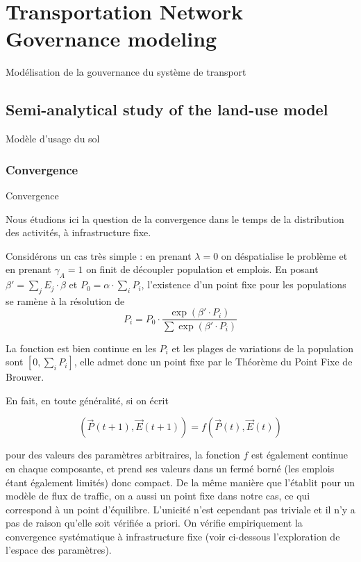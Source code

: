 
\newpage

\section{Transportation Network Governance modeling}{Modélisation de la gouvernance du système de transport}

\label{app:sec:lutecia}


\subsection{Semi-analytical study of the land-use model}{Modèle d'usage du sol}


\subsubsection{Convergence}{Convergence}

Nous étudions ici la question de la convergence dans le temps de la distribution des activités, à infrastructure fixe.

Considérons un cas très simple : en prenant $\lambda = 0$ on déspatialise le problème et en prenant $\gamma_A = 1$ on finit de découpler population et emplois. En posant $\beta' = \sum_j E_j \cdot \beta$ et $P_0 = \alpha \cdot \sum_i P_i$, l'existence d'un point fixe pour les populations se ramène à la résolution de
\[
P_i = P_0 \cdot \frac{\exp\left(\beta' \cdot P_i\right)}{\sum \exp\left(\beta' \cdot P_i\right)}
\]

La fonction est bien continue en les $P_i$ et les plages de variations de la population sont $[0,\sum_i P_i]$, elle admet donc un point fixe par le Théorème du Point Fixe de Brouwer. 

En fait, en toute généralité, si on écrit

\[
(\vec{P}(t+1),\vec{E}(t+1)) = f(\vec{P}(t),\vec{E}(t))
\]

pour des valeurs des paramètres arbitraires, la fonction $f$ est également continue en chaque composante, et prend ses valeurs dans un fermé borné (les emplois étant également limités) donc compact. De la même manière que \cite{leurent2014user} l'établit pour un modèle de flux de traffic, on a aussi un point fixe dans notre cas, ce qui correspond à un point d'équilibre. L'unicité n'est cependant pas triviale et il n'y a pas de raison qu'elle soit vérifiée a priori. On vérifie empiriquement la convergence systématique à infrastructure fixe (voir ci-dessous l'exploration de l'espace des paramètres).


